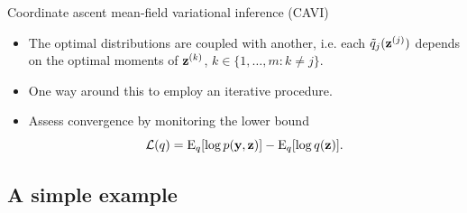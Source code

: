 \begin{frame}{Coordinate ascent mean-field variational inference (CAVI)}
  \vspace{-5pt}
  \begin{itemize}\setlength\itemsep{0.4em}
    \item The optimal distributions are coupled with another, i.e. each $\tilde q_j({\mathbf z}^{(j)})$ depends on the optimal moments of ${\mathbf z}^{(k)}$, $k \in \{1,\dots,m:k \neq j\}$.
    \item One way around this to employ an iterative procedure.
    \item Assess convergence by monitoring the lower bound
    \[
      {\mathcal L}(q) = \operatorname{E}_{ q}[\log p({\mathbf y}, {\mathbf z})] - \operatorname{E}_{ q}[\log q({\mathbf z})].
    \]
  \end{itemize}
  \vspace{-11pt}
    \begin{center}
  \end{center}
\end{frame}

\subsection{A simple example}

